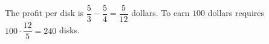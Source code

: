 The profit per disk is $\dfrac{5}{3}-\dfrac{5}{4}=\dfrac{5}{12}$ dollars. To earn $100$ dollars requires $100\cdot\dfrac{12}{5}=\boxed{240}$ disks.
